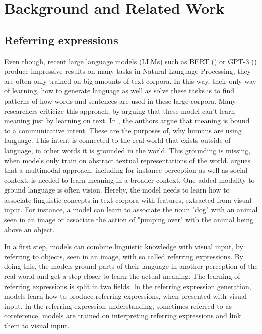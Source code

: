 \section{Background and Related Work}
\label{sec:background}


\subsection{Referring expressions}
Even though, recent large language models (LLMs) such as BERT (\citet{Devlin2018}) or GPT-3 (\citet{Brown2020}) produce impressive results on many tasks in Natural Language Processing, they are often only trained on big amounts of text corpora.
In this way, their only way of learning, how to generate language as well as solve these tasks is to find patterns of how words and sentences are used in these large corpora.
Many researchers criticize this approach, by arguing that these model can't learn meaning just by learning on text.
In \citet{Bender2020}, the authors argue that meaning is bound to a communicative intent.
These are the purposes of, why humans are using language.
This intent is connected to the real world that exists outside of language, in other words it is grounded in the world.
This grounding is missing, when models only train on abstract textual representations of the world.
\citet{Bisk2020} argues that a multimodal approach, including for instance perception as well as social context, is needed to learn meaning in a broader context.
One added modality to ground language is often vision. 
Hereby, the model needs to learn how to associate linguistic concepts in text corpora with features, extracted from visual input.
For instance, a model can learn to associate the noun "dog" with an animal seen in an image or associate the action of "jumping over" with the animal being above an object.

In a first step, models can combine linguistic knowledge with visual input, by referring to objects, seen in an image, with so called referring expressions.
By doing this, the models ground parts of their language in another perception of the real world and get a step closer to learn the actual meaning.
The learning of referring expressions is split in two fields.
In the referring expression generation, models learn how to produce referring expressions, when presented with visual input.
In the referring expression understanding, sometimes referred to as coreference, models are trained on interpreting referring expressions and link them to visual input.



